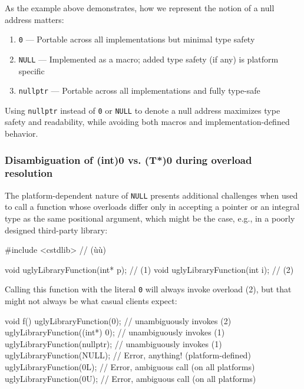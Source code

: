 As the example above demonstrates, how we represent the notion of a
null address matters:
\begin{enumerate}
\item{\lstinline!0! — Portable across all implementations but minimal type safety}
\item{\lstinline!NULL! — Implemented as a macro; added type safety (if any) is platform specific}
\item{\lstinline!nullptr! — Portable across all implementations and fully type-safe}
\end{enumerate}
Using \lstinline!nullptr! instead of \lstinline!0! or \lstinline!NULL! to denote
a null address maximizes type safety and readability, while avoiding
both macros and implementation-defined behavior.

\subsubsection[Disambiguation of \lstinline!(int)0! vs. \lstinline!(T*)0! during overload resolution]{Disambiguation of {\SubsubsecCode (int)0} vs. {\SubsubsecCode (T*)0} during overload resolution}\label{disambiguation-of-(int)-0-versus-(t*)-0-during-overload-resolution}

The platform-dependent nature of \lstinline!NULL! presents additional
challenges when used to call a function whose overloads differ only in
accepting a pointer or an integral type as the same positional argument, which might be the case, e.g., in a poorly designed third-party
library:

\begin{emcppshiddenlisting}[emcppsbatch=e3]
#include <cstdlib>  // (ù{}ù)
\end{emcppshiddenlisting}
\begin{emcppslisting}[emcppsbatch=e3]
void uglyLibraryFunction(int* p);  // (1)
void uglyLibraryFunction(int  i);  // (2)
\end{emcppslisting}


\noindent Calling this function with the literal \lstinline!0! will always invoke
overload (2), but that might not always be what casual clients expect:

\begin{emcppslisting}[emcppsbatch=e3]
void f()
{
    uglyLibraryFunction(0);         // unambiguously invokes (2)
    uglyLibraryFunction((int*) 0);  // unambiguously invokes (1)
    uglyLibraryFunction(nullptr);   // unambiguously invokes (1)
    uglyLibraryFunction(NULL);      // Error, anything! (platform-defined)
    uglyLibraryFunction(0L);        // Error, ambiguous call (on all platforms)
    uglyLibraryFunction(0U);        // Error, ambiguous call (on all platforms)
}
\end{emcppslisting}


